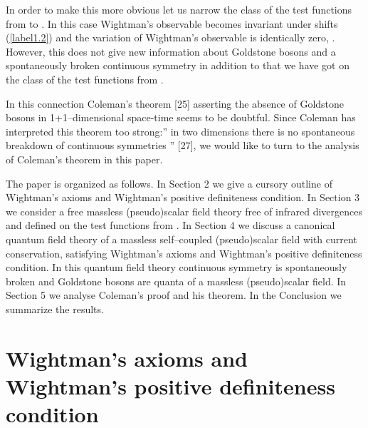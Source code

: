 \documentclass[a4paper,12pt] {article}
\begin{document}
In order to make this more obvious let us narrow the class of the test
functions from \coordHE{} to \coordHE{}. In this case Wightman's observable
\coordHE{} becomes invariant under shifts (\ref{label1.2}) and the
variation of Wightman's observable \coordHE{} is
identically zero, \coordHE{}. However, this does not
give new information about Goldstone bosons and a spontaneously broken
continuous symmetry in addition to that we have got on the class of
the test functions from \coordHE{}.

In this connection Coleman's theorem [25] asserting the absence of
Goldstone bosons in 1+1--dimensional space-time seems to be
doubtful. Since Coleman has interpreted this theorem too
strong:''\myHighlight{$\ldots$}\coordHE{} in two dimensions there is no spontaneous breakdown
of continuous symmetries \myHighlight{$\ldots$}\coordHE{}'' [27], we would like to turn to the
analysis of Coleman's theorem in this paper.

The paper is organized as follows. In Section 2 we give a cursory
outline of Wightman's axioms and Wightman's positive definiteness
condition. In Section 3 we consider a free massless (pseudo)scalar
field theory free of infrared divergences and defined on the test
functions from \coordHE{}. In Section 4 we discuss
a canonical quantum field theory of a massless self--coupled
(pseudo)scalar field with current conservation, satisfying Wightman's
axioms and Wightman's positive definiteness condition.  In this
quantum field theory continuous symmetry is spontaneously broken and
Goldstone bosons are quanta of a massless (pseudo)scalar field. In
Section 5 we analyse Coleman's proof and his theorem. In the
Conclusion we summarize the results.

\section{Wightman's axioms and Wightman's positive definiteness 
condition}
\setcounter{equation}{0}
\end{document}
